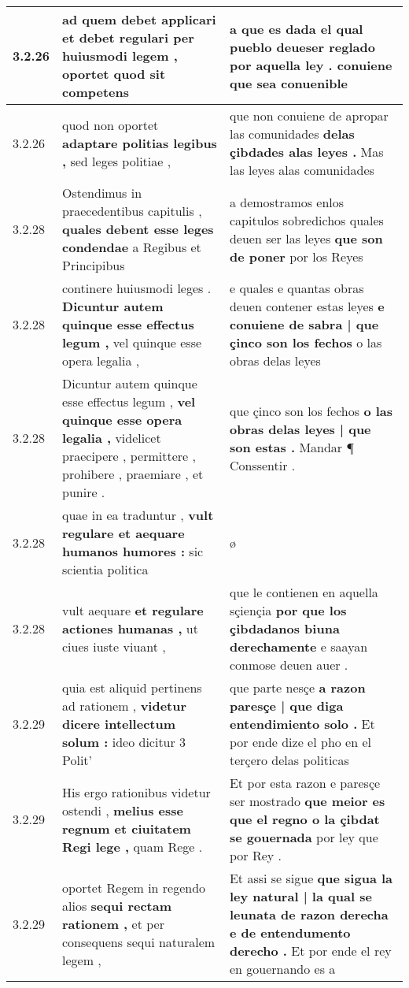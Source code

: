 \begin{tabular}{|p{1cm}|p{6.5cm}|p{6.5cm}|}
3.2.26 & ad quem debet applicari \textbf{ et debet regulari per huiusmodi legem , } oportet quod sit competens & a que es dada \textbf{ el qual pueblo deueser reglado por aquella ley . } conuiene que sea conuenible \\\hline
3.2.26 & quod non oportet \textbf{ adaptare politias legibus , } sed leges politiae , & que non conuiene de apropar las comunidades \textbf{ delas çibdades alas leyes . } Mas las leyes alas comunidades \\\hline
3.2.28 & Ostendimus in praecedentibus capitulis , \textbf{ quales debent esse leges condendae } a Regibus et Principibus & a demostramos enlos capitulos sobredichos quales deuen ser las leyes \textbf{ que son de poner } por los Reyes \\\hline
3.2.28 & continere huiusmodi leges . \textbf{ Dicuntur autem quinque esse effectus legum , } vel quinque esse opera legalia , & e quales e quantas obras deuen contener estas leyes \textbf{ e conuiene de sabra | que çinco son los fechos } o las obras delas leyes \\\hline
3.2.28 & Dicuntur autem quinque esse effectus legum , \textbf{ vel quinque esse opera legalia , } videlicet praecipere , permittere , prohibere , praemiare , et punire . & que çinco son los fechos \textbf{ o las obras delas leyes | que son estas . } Mandar ¶ Conssentir . \\\hline
3.2.28 & quae in ea traduntur , \textbf{ vult regulare et aequare humanos humores : } sic scientia politica & ø \\\hline
3.2.28 & vult aequare \textbf{ et regulare actiones humanas , } ut ciues iuste viuant , & que le contienen en aquella sçiençia \textbf{ por que los çibdadanos biuna derechamente } e saayan conmose deuen auer . \\\hline
3.2.29 & quia est aliquid pertinens ad rationem , \textbf{ videtur dicere intellectum solum : } ideo dicitur 3 Polit’ & que parte nesçe \textbf{ a razon paresçe | que diga entendimiento solo . } Et por ende dize el pho en el terçero delas politicas \\\hline
3.2.29 & His ergo rationibus videtur ostendi , \textbf{ melius esse regnum et ciuitatem Regi lege , } quam Rege . & Et por esta razon e paresçe ser mostrado \textbf{ que meior es que el regno o la çibdat se gouernada } por ley que por Rey . \\\hline
3.2.29 & oportet Regem in regendo alios \textbf{ sequi rectam rationem , } et per consequens sequi naturalem legem , & Et assi se sigue \textbf{ que sigua la ley natural | la qual se leunata de razon derecha e de entendumento derecho . } Et por ende el rey en gouernando es a \\\hline

\end{tabular}
